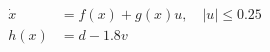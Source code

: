 \documentclass[preview]{standalone}
\begin{document}
\begin{align*}
\dot x &= f(x) + g(x) u,  \quad |u| \leq 0.25\\ h(x) &= d - 1.8 v
\end{align*}
\end{document}
